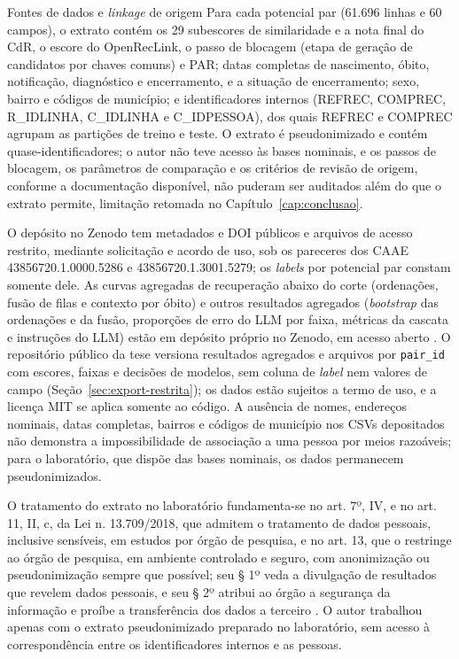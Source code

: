 \begin{chapter}{Fontes de dados e \textit{linkage} de origem}
Para cada potencial par (61.696 linhas e 60 campos), o extrato contém os 29 subescores de similaridade e a nota final do CdR, o escore do OpenRecLink, o passo de blocagem (etapa de geração de candidatos por chaves comuns) e PAR; datas completas de nascimento, óbito, notificação, diagnóstico e encerramento, e a situação de encerramento; sexo, bairro e códigos de município; e identificadores internos (REFREC, COMPREC, R\_IDLINHA, C\_IDLINHA e C\_IDPESSOA), dos quais REFREC e COMPREC agrupam as partições de treino e teste. O extrato é pseudonimizado e contém quase-identificadores; o autor não teve acesso às bases nominais, e os passos de blocagem, os parâmetros de comparação e os critérios de revisão de origem, conforme a documentação disponível, não puderam ser auditados além do que o extrato permite, limitação retomada no Capítulo~\ref{cap:conclusao}.

O depósito no Zenodo tem metadados e DOI públicos e arquivos de acesso restrito, mediante solicitação e acordo de uso, sob os pareceres dos CAAE 43856720.1.0000.5286 e 43856720.1.3001.5279; os \textit{labels} por potencial par constam somente dele. As curvas agregadas de recuperação abaixo do corte (ordenações, fusão de filas e contexto por óbito) e outros resultados agregados (\textit{bootstrap} das ordenações e da fusão, proporções de erro do LLM por faixa, métricas da cascata e instruções do LLM) estão em depósito próprio no Zenodo, em acesso aberto \cite{Jardim2026curvas}. O repositório público da tese versiona resultados agregados e arquivos por \texttt{pair\_id} com escores, faixas e decisões de modelos, sem coluna de \textit{label} nem valores de campo (Seção~\ref{sec:export-restrita}); os dados estão sujeitos a termo de uso, e a licença MIT se aplica somente ao código. A ausência de nomes, endereços nominais, datas completas, bairros e códigos de município nos CSVs depositados não demonstra a impossibilidade de associação a uma pessoa por meios razoáveis; para o laboratório, que dispõe das bases nominais, os dados permanecem pseudonimizados.

O tratamento do extrato no laboratório fundamenta-se no art. 7º, IV, e no art. 11, II, c, da Lei n. 13.709/2018, que admitem o tratamento de dados pessoais, inclusive sensíveis, em estudos por órgão de pesquisa, e no art. 13, que o restringe ao órgão de pesquisa, em ambiente controlado e seguro, com anonimização ou pseudonimização sempre que possível; seu § 1º veda a divulgação de resultados que revelem dados pessoais, e seu § 2º atribui ao órgão a segurança da informação e proíbe a transferência dos dados a terceiro \cite{BrasilLGPD2018}. O autor trabalhou apenas com o extrato pseudonimizado preparado no laboratório, sem acesso à correspondência entre os identificadores internos e as pessoas.


\end{chapter}
